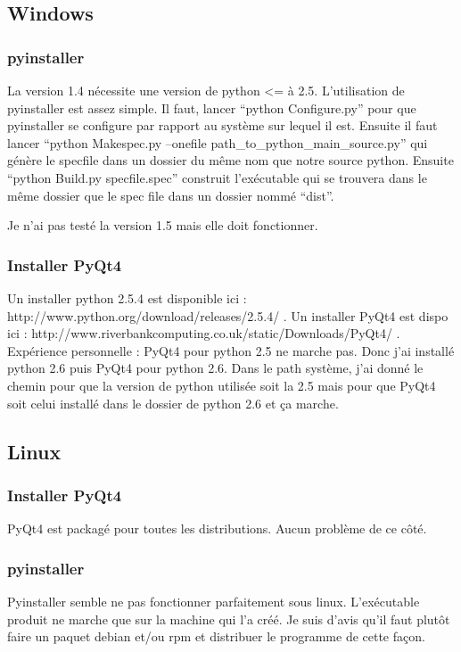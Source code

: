 \documentclass[12pt,a4paper]{article}
\begin{document}
    \subsection{Windows}
        \subsubsection{pyinstaller}
        La version 1.4 nécessite une version de python <= à 2.5. L'utilisation de pyinstaller est assez simple. Il faut, 
        lancer ``python Configure.py'' pour que pyinstaller se configure par rapport au système sur lequel il est. Ensuite il faut
        lancer ``python Makespec.py --onefile path\_to\_python\_main\_source.py'' qui génère le specfile dans un dossier du même nom que
        notre source python. Ensuite ``python Build.py specfile.spec'' construit l'exécutable qui se trouvera dans le même dossier que le spec file
        dans un dossier nommé ``dist''.

        Je n'ai pas testé la version 1.5 mais elle doit fonctionner.

        \subsubsection{Installer PyQt4}
        Un installer python 2.5.4 est disponible ici : http://www.python.org/download/releases/2.5.4/ . 
        Un installer PyQt4 est dispo ici : http://www.riverbankcomputing.co.uk/static/Downloads/PyQt4/ .
        Expérience personnelle : PyQt4 pour python 2.5 ne marche pas. Donc j'ai installé python 2.6 puis 
        PyQt4 pour python 2.6. Dans le path système, j'ai donné le chemin pour que la version de python utilisée
        soit la 2.5 mais pour que PyQt4 soit celui installé dans le dossier de python 2.6 et ça marche.
    \subsection{Linux}
        \subsubsection{Installer PyQt4}
        PyQt4 est packagé pour toutes les distributions. Aucun problème de ce côté.
        \subsubsection{pyinstaller}
        Pyinstaller semble ne pas fonctionner parfaitement sous linux. L'exécutable produit ne marche que
        sur la machine qui l'a créé. Je suis d'avis qu'il faut plutôt faire un paquet debian et/ou rpm
        et distribuer le programme de cette façon.
\end{document}
